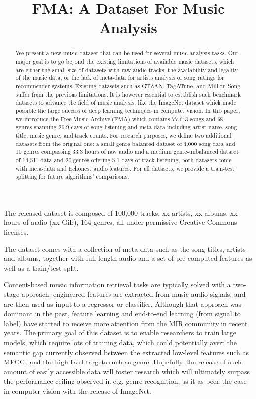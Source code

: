 \documentclass{article}
\title{FMA: A Dataset For Music Analysis}
\begin{document}
\maketitle

\begin{abstract}
We present a new music dataset that can be used for several music analysis tasks. Our major goal is to go beyond the existing limitations of available music datasets, which are either the small size of datasets with raw audio tracks, the availability and legality of the music data, or the lack of meta-data for artists analysis or song ratings for recommender systems. Existing datasets such as GTZAN, TagATune, and Million Song suffer from the previous limitations. It is however essential to establish such benchmark datasets to advance the field of music analysis, like the ImageNet dataset which made possible the large success of deep learning techniques in computer vision. In this paper, we introduce the Free Music Archive (FMA) which contains 77,643 songs and 68 genres spanning 26.9 days of song listening and meta-data including artist name, song title, music genre, and track counts. For research purposes, we define two additional datasets from the original one: a small genre-balanced dataset of 4,000 song data and 10 genres compassing 33.3 hours of raw audio and a medium genre-unbalanced dataset of 14,511 data and 20 genres offering 5.1 days of track listening, both datasets come with meta-data and Echonest audio features. For all datasets, we provide a train-test splitting for future algorithms' comparisons.
\end{abstract}

The released dataset is composed of 100,000 tracks, xx artists, xx albums, xx hours of audio (xx GiB), 164 genres, all under permissive Creative Commons licenses.

The dataset comes with a collection of meta-data such as the song titles, artists and albums, together with full-length audio and a set of pre-computed features as well as a train/test split.

Content-based music information retrieval tasks are typically solved with a two-stage approach: engineered features are extracted from music audio signals, and are then used as input to a regressor or classifier.
Although that approach was dominant in the past, feature learning and end-to-end learning (from signal to label) have started to receive more attention from the MIR community in recent years. 
The primary goal of this dataset is to enable researchers to train large models, which require lots of training data, which could potentially avert the semantic gap currently observed between the extracted low-level features such as MFCCs and the high-level targets such as genre.
Hopefully, the release of such amount of easily accessible data will foster research which will ultimately surpass the performance ceiling observed in e.g. genre recognition, as it as been the case in computer vision with the release of ImageNet.
\end{document}
